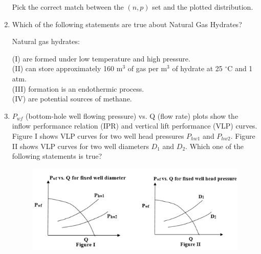 \documentclass[12pt,a4paper]{article}
\begin{document}
\begin{enumerate}
Pick the correct match between the $(n, p)$ set and the plotted distribution.

\begin{enumerate}
\end{enumerate}

\pagebreak

\item Which of the following statements are true about Natural Gas Hydrates?
\hfill{}

\vspace{0.2cm}
\noindent
Natural gas hydrates:


\noindent
(I) are formed under low temperature and high pressure.\\
(II) can store approximately 160 m$^3$ of gas per m$^3$ of hydrate at 25 $^\circ$C and 1 atm.\\
(III) formation is an endothermic process.\\
(IV) are potential sources of methane.


\begin{enumerate} 
\end{enumerate}

\item $P_{wf}$ (bottom-hole well flowing pressure) vs. Q (flow rate) plots show the inflow
performance relation (IPR) and vertical lift performance (VLP) curves. Figure I shows
VLP curves for two well head pressures $P_{hw1}$ and $P_{hw2}$. Figure II shows VLP curves for two
well diameters $D_1$ and $D_2$. Which one of the following statements is true?\hfill{}
\begin{figure}[h!]
  \centering
  \includegraphics[width=0.8\columnwidth]{figs/pic9.png} 
\end{figure}


\end{enumerate}
\end{document}
